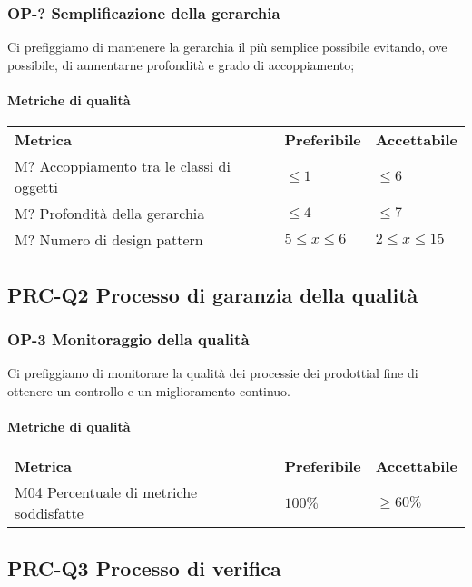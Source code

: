 		\subsubsection{OP-? Semplificazione della gerarchia}
		Ci prefiggiamo di mantenere la gerarchia il più semplice possibile evitando, ove possibile, di aumentarne profondità e grado di accoppiamento;
		\paragraph{Metriche di qualità} \mbox{}
		\begin{longtable} {
				>{}p{80mm} 
				>{}p{25mm}
				>{}p{25mm}
			}
			\rowcolor{gray!50}
			\textbf{Metrica} & \textbf{Preferibile} & \textbf{Accettabile} \TBstrut \TBstrut \\
			M? Accoppiamento tra le classi di oggetti & $\le 1$ & $\le 6$ \TBstrut \\ [2mm]
			M? Profondità della gerarchia & $\le 4$ & $\le 7$ \TBstrut \\ [2mm]
			M? Numero di design pattern & $5 \le x \le 6$ & $2 \le x \le 15$ \TBstrut \\ [2mm]
		\end{longtable}
			
	\subsection{PRC-Q2 Processo di garanzia della qualità}
		\subsubsection{OP-3 Monitoraggio della qualità}
			Ci prefiggiamo di monitorare la qualità dei processi\glosp e dei prodotti\glosp al fine di ottenere un controllo e un miglioramento continuo. 
			\paragraph{Metriche di qualità} \mbox{} 
			\begin{longtable} {
					>{}p{80mm} 
					>{}p{25mm}
					>{}p{25mm}
				}
				\rowcolor{gray!50}
				\textbf{Metrica} & \textbf{Preferibile} & \textbf{Accettabile} \TBstrut \TBstrut \\
				M04 Percentuale di metriche soddisfatte & $100\%$ & $\ge 60\%$ \TBstrut \\ [2mm]
			\end{longtable}

	\subsection{PRC-Q3 Processo di verifica}
